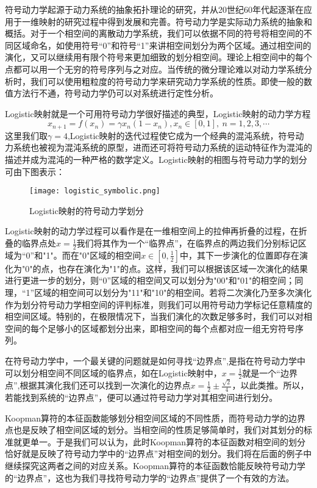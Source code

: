 符号动力学起源于动力系统的抽象拓扑理论的研究，并从20世纪60年代起逐渐在应用于一维映射的研究过程中得到发展和完善。符号动力学是实际动力系统的抽象和概括。对于一个相空间的离散动力学系统，我们可以依据不同的符号将相空间的不同区域命名，如使用符号“0”和符号“1”来讲相空间划分为两个区域。通过相空间的演化，又可以继续用有限个符号来更加细致的划分相空间。理论上相空间中的每个点都可以用一个无穷的符号序列与之对应。当传统的微分理论难以对动力学系统分析时，我们可以使用粗粒度的符号动力学来研究动力学系统的性质。即使一般的数值方法行不通，符号动力学仍可以对系统进行定性分析。

Logistic映射就是一个可用符号动力学很好描述的典型，Logistic映射的动力学方程
\begin{equation}
    x_{n+1}=f(x_n)=\gamma x_n (1-x_n ),x_n∈[0,1],\ n=1,2,3,\cdots
\end{equation}
这里我们取$\gamma=4$,Logistic映射的迭代过程使它成为一个经典的混沌系统，符号动力系统也被视为混沌系统的原型，进而还可将符号动力系统的运动特征作为混沌的描述并成为混沌的一种严格的数学定义。Logistic映射的相图与符号动力学的划分可由下图表示：
\begin{figure}
	\centering
	\texttt{[image: logistic\_symbolic.png]}
    \caption{Logistic映射的符号动力学划分}
    \label{fig:logi_symb}
\end{figure}
Logistic映射的动力学过程可以看作是在一维相空间上的拉伸再折叠的过程，在折叠的临界点处$x=\frac{1}{2}$我们将其作为一个“临界点”，在临界点的两边我们分别标记区域为“0”和"1"。而在"0"区域的相空间$x\in [0,\frac{1}{2}]$中，其下一步演化的位置即存在演化为"0"的点，也存在演化为"1"的点。这样，我们可以根据该区域一次演化的结果进行更进一步的划分，则“0”区域的相空间又可以划分为"00"和"01"的相空间；同理，“1”区域的相空间可以划分为"11"和"10"的相空间。若将二次演化乃至多次演化作为划分符号动力学相空间的评判标准，则我们可以用符号动力学标记任意精度的相空间区域。特别的，在极限情况下，当我们演化的次数足够多时，我们可以对相空间的每个足够小的区域都划分出来，即相空间的每个点都对应一组无穷符号序列。

在符号动力学中，一个最关键的问题就是如何寻找“边界点”,是指在符号动力学中可以划分相空间不同区域的临界点，如在Logistic映射中，$x=\frac{1}{2}$就是一个“边界点”,根据其演化我们还可以找到一次演化的边界点$x=\frac{1}{2}\pm\frac{\sqrt{2}}{4}$，以此类推。所以，若能找到系统的“边界点”，便可以通过符号动力学对其相空间进行划分。

Koopman算符的本征函数能够划分相空间区域的不同性质，而符号动力学的边界点也是反映了相空间区域的划分。当相空间的性质足够简单时，我们对其划分的标准就更单一。于是我们可以认为，此时Koopman算符的本征函数对相空间的划分恰好就是反映了符号动力学中的“边界点”对相空间的划分。我们将在后面的例子中继续探究这两者之间的对应关系。Koopman算符的本征函数恰能反映符号动力学的“边界点”，这也为我们寻找符号动力学的“边界点”提供了一个有效的方法。

